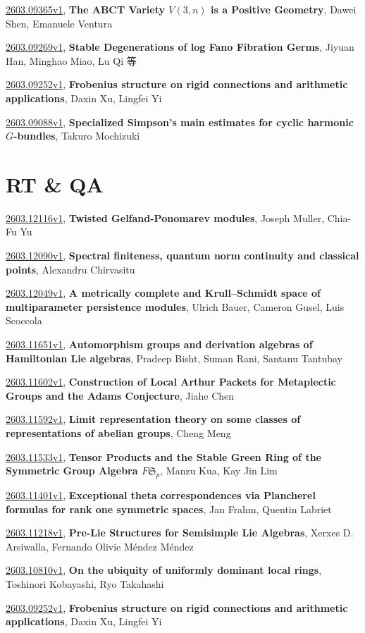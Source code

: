 \documentclass[9pt, a4paper]{article}
\theoremstyle{plain}
\theoremstyle{definition}
\theoremstyle{remark}
\newcommand{\arxiv}[3]{\href{https://arxiv.org/abs/#1}{#1}, \textbf{\textcolor{arxivblue}{#2}}, #3}
\begin{document}
\arxiv{2603.09365v1}{The ABCT Variety $V(3,n)$ is a Positive Geometry}{Dawei Shen, Emanuele Ventura}

\arxiv{2603.09269v1}{Stable Degenerations of log Fano Fibration Germs}{Jiyuan Han, Minghao Miao, Lu Qi 等}

\arxiv{2603.09252v1}{Frobenius structure on rigid connections and arithmetic applications}{Daxin Xu, Lingfei Yi}

\arxiv{2603.09088v1}{Specialized Simpson's main estimates for cyclic harmonic $G$-bundles}{Takuro Mochizuki}


\section{RT \& QA}
\arxiv{2603.12116v1}{Twisted Gelfand-Ponomarev modules}{Joseph Muller, Chia-Fu Yu}

\arxiv{2603.12090v1}{Spectral finiteness, quantum norm continuity and classical points}{Alexandru Chirvasitu}

\arxiv{2603.12049v1}{A metrically complete and Krull--Schmidt space of multiparameter persistence modules}{Ulrich Bauer, Cameron Gusel, Luis Scoccola}

\arxiv{2603.11651v1}{Automorphism groups and derivation algebras of Hamiltonian Lie algebras}{Pradeep Bisht, Suman Rani, Santanu Tantubay}

\arxiv{2603.11602v1}{Construction of Local Arthur Packets for Metaplectic Groups and the Adams Conjecture}{Jiahe Chen}

\arxiv{2603.11592v1}{Limit representation theory on some classes of representations of abelian groups}{Cheng Meng}

\arxiv{2603.11533v1}{Tensor Products and the Stable Green Ring of the Symmetric Group Algebra $F\mathfrak{S}_p$}{Manzu Kua, Kay Jin Lim}

\arxiv{2603.11401v1}{Exceptional theta correspondences via Plancherel formulas for rank one symmetric spaces}{Jan Frahm, Quentin Labriet}

\arxiv{2603.11218v1}{Pre-Lie Structures for Semisimple Lie Algebras}{Xerxes D. Arsiwalla, Fernando Olivie Méndez Méndez}

\arxiv{2603.10810v1}{On the ubiquity of uniformly dominant local rings}{Toshinori Kobayashi, Ryo Takahashi}

\arxiv{2603.09252v1}{Frobenius structure on rigid connections and arithmetic applications}{Daxin Xu, Lingfei Yi}
\end{document}
